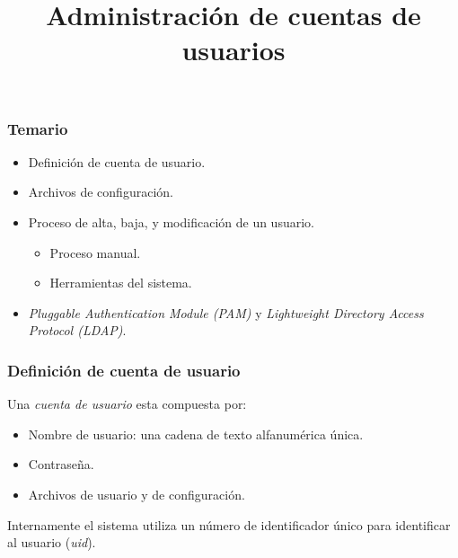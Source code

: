 \documentclass[11pt,a4paper,spanish]{beamer}
\title{\textbf{Administración de cuentas de usuarios}}
\author{}
\date{}
\begin{document}
\begin{frame}[noframenumbering]

    \maketitle

\end{frame}

\begin{frame}[label=temario]

    \frametitle{Temario}

\begin{itemize}

    \item Definición de cuenta de usuario.
    \item Archivos de configuración.
    \item Proceso de alta, baja, y modificación de un usuario.
        \begin{itemize}
            \item Proceso manual.
            \item Herramientas del sistema.
        \end{itemize}
    \item \emph{Pluggable Authentication Module (PAM)} y \emph{Lightweight
        Directory Access Protocol (LDAP)}.

\end{itemize}

\end{frame}

\begin{frame}

    \frametitle{Definición de cuenta de usuario}

    Una \emph{cuenta de usuario} esta compuesta por:
    \begin{itemize}
        \item Nombre de usuario: una cadena de texto alfanumérica única.
        \item Contraseña.
        \item Archivos de usuario y de configuración.
    \end{itemize}

    Internamente el sistema utiliza un número de identificador único para
    identificar al usuario (\emph{uid}).

\end{frame}
\end{document}
